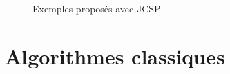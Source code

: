 \documentclass[a4paper,11pt,french]{report}
\begin{document}
\begin{figure}[htp]
  \centering
  \vspace{1pt}               
  \caption{Exemples proposés avec JCSP}
  \label{fig:jcsp}
\end{figure}

\section{Algorithmes classiques}
\end{document}
